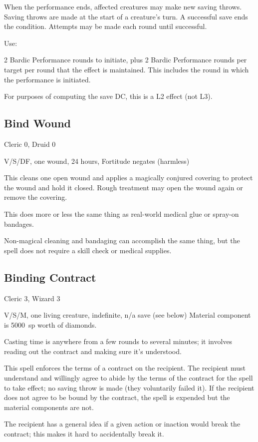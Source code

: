 When the performance ends, affected creatures may make new saving throws.
Saving throws are made at the start of a creature's turn. A successful
save ends the condition. Attempts may be made each round until successful.

Use:

2 Bardic Performance rounds to initiate, plus 2 Bardic Performance rounds
per target per round that the effect is maintained. This includes the
round in which the performance is initiated.

For purposes of computing the save DC, this is a L2 effect (not L3).
%

%
\subsection{Bind Wound}

Cleric 0, Druid 0

V/S/DF, one wound, 24 hours, Fortitude negates (harmless)

This cleans one open wound and applies a magically conjured covering to
protect the wound and hold it closed. Rough treatment may open the wound
again or remove the covering.

This does more or less the same thing as real-world medical glue or
spray-on bandages.

Non-magical cleaning and bandaging can accomplish the same thing, but the
spell does not require a skill check or medical supplies.
%

%
\subsection{Binding Contract}

Cleric 3, Wizard 3

V/S/M, one living creature, indefinite, n/a save (see below)
Material component is 5000~sp worth of diamonds.

Casting time is anywhere from a few rounds to several minutes; it involves
reading out the contract and making sure it's understood.

This spell enforces the terms of a contract on the recipient. The recipient
must understand and willingly agree to abide by the terms of the contract
for the spell to take effect; no saving throw is made (they voluntarily
failed it). If the recipient does not agree to be bound by the contract,
the spell is expended but the material components are not.

The recipient has a general idea if a given action or inaction would break
the contract; this makes it hard to accidentally break it.

